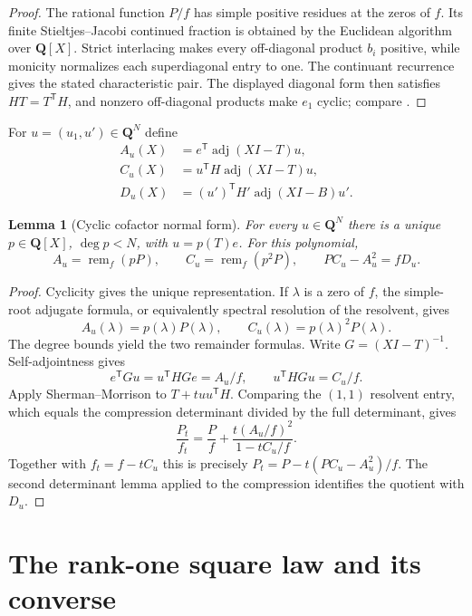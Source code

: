 \documentclass[11pt,reqno]{amsart}
\newtheorem{lemma}[theorem]{Lemma}
\theoremstyle{definition}
\theoremstyle{remark}
\DeclareMathOperator{\adj}{adj}
\DeclareMathOperator{\rem}{rem}
\newcommand{\Q}{\mathbf Q}
\begin{document}
\begin{proof}
The rational function $P/f$ has simple positive residues at the zeros of
$f$.  Its finite Stieltjes--Jacobi continued fraction is obtained by the
Euclidean algorithm over $\Q[X]$.  Strict interlacing makes every
off-diagonal product $b_i$ positive, while monicity normalizes each
superdiagonal entry to one.  The continuant recurrence gives the stated
characteristic pair.  The displayed diagonal form then satisfies
$HT=T^{\mathsf T}H$, and nonzero off-diagonal products make $e_1$ cyclic;
compare \cite{hochstadt,deboor}.
\end{proof}

For $u=(u_1,u')\in\Q^N$ define
\begin{align}
 A_u(X)&=e^{\mathsf T}\adj(XI-T)u,\label{eq:Adef}\\
 C_u(X)&=u^{\mathsf T}H\adj(XI-T)u,\label{eq:Cdef}\\
 D_u(X)&=(u')^{\mathsf T}H'\adj(XI-B)u'.\label{eq:Ddef}
\end{align}

\begin{lemma}[Cyclic cofactor normal form]\label{lem:rankone-normal}
For every $u\in\Q^N$ there is a unique $p\in\Q[X]$, $\deg p<N$, with
$u=p(T)e$.  For this polynomial,
\begin{equation}\label{eq:normalform}
 A_u=\rem_f(pP),\qquad C_u=\rem_f(p^2P),
 \qquad PC_u-A_u^2=fD_u.
\end{equation}
\end{lemma}

\begin{proof}
Cyclicity gives the unique representation.  If $\lambda$ is a zero of $f$,
the simple-root adjugate formula, or equivalently spectral resolution of the
resolvent, gives
\[
 A_u(\lambda)=p(\lambda)P(\lambda),\qquad
 C_u(\lambda)=p(\lambda)^2P(\lambda).
\]
The degree bounds yield the two remainder formulas.  Write
$G=(XI-T)^{-1}$.  Self-adjointness gives
\[
 e^{\mathsf T}Gu=u^{\mathsf T}HGe=A_u/f,\qquad
 u^{\mathsf T}HGu=C_u/f.
\]
Apply Sherman--Morrison to $T+tuu^{\mathsf T}H$.  Comparing the $(1,1)$
resolvent entry, which equals the compression determinant divided by the full
determinant, gives
\[
 \frac{P_t}{f_t}=\frac Pf+
 \frac{t(A_u/f)^2}{1-tC_u/f}.
\]
Together with $f_t=f-tC_u$ this is precisely
$P_t=P-t(PC_u-A_u^2)/f$.  The second determinant lemma applied to the
compression identifies the quotient with $D_u$.
\end{proof}

\section{The rank-one square law and its converse}
\end{document}
